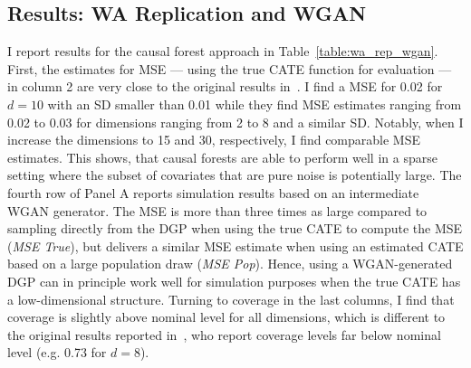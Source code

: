 \documentclass[11pt, a4paper, leqno]{article}
\begin{document}
\subsection{Results: WA Replication and WGAN}
I report results for the causal forest approach in Table~\ref*{table:wa_rep_wgan}.
First, the estimates for MSE --- using the true CATE function for evaluation --- in column 2 are very close to the original results in~\citet{wager2018estimation}.
I find a MSE for 0.02 for $d=10$ with an SD smaller than 0.01 while they find MSE estimates ranging from 0.02 to 0.03 for dimensions ranging from 2 to 8 and a similar SD\@.
Notably, when I increase the dimensions to 15 and 30, respectively, I find comparable MSE estimates.
This shows, that causal forests are able to perform well in a sparse setting where the subset of covariates that are pure noise is potentially large.
The fourth row of Panel A reports simulation results based on an intermediate WGAN generator.
The MSE is more than three times as large compared to sampling directly from the DGP when using the true CATE to compute the MSE (\textit{MSE True}), but delivers a similar MSE estimate when using an estimated CATE based on a large population draw (\textit{MSE Pop}).
Hence, using a WGAN-generated DGP can in principle work well for simulation purposes when the true CATE has a low-dimensional structure.
Turning to coverage in the last columns, I find that coverage is slightly above nominal level for all dimensions, which is different to the original results reported in~\citet{wager2018estimation}, who report coverage levels far below nominal level (e.g. 0.73 for $d=8$).
\end{document}

